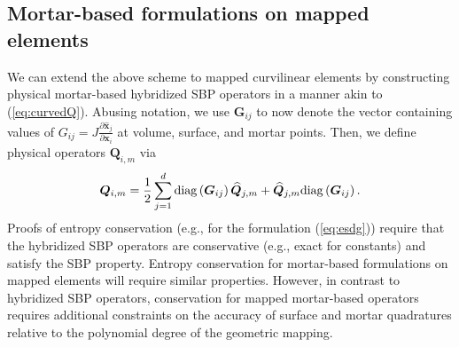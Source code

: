 \documentclass{svjour3}                     %
\renewcommand{\hat}{\widehat}
\renewcommand{\tilde}{\widetilde}
\newcommand{\diag}[1]{{\rm diag}\LRp{#1}}
\newcommand{\td}[2]{\frac{{\rm d}#1}{{\rm d}{\rm #2}}}
\newcommand{\pd}[2]{\frac{\partial#1}{\partial#2}}
\newcommand{\LRp}[1]{\left( #1 \right)}
\renewcommand{\note}[1]{{\color{blue}{#1}}}
\begin{document}
%


\subsection{Mortar-based formulations on mapped elements}

We can extend the above scheme to mapped curvilinear elements by constructing physical mortar-based hybridized SBP operators in a manner akin to (\ref{eq:curvedQ}).  Abusing notation, we use $\bm{G}_{ij}$ to now denote the vector containing values of $G_{ij} = J\pd{\hat{\bm{x}}_j}{\bm{x}_i}$ at volume, surface, and mortar points.  Then, we define physical operators $\bm{Q}_{i,m}$ via
\begin{equation}
\bm{Q}_{i,m} = \frac{1}{2}\sum_{j=1}^d \diag{\bm{G}_{ij}}\hat{\bm{Q}}_{j,m} + \hat{\bm{Q}}_{j,m} \diag{\bm{G}_{ij}}.
\label{eq:curvedQ_mortar}
\end{equation}
Proofs of entropy conservation (e.g., for the formulation (\ref{eq:esdg})) require that the hybridized SBP operators are conservative (e.g., exact for constants) and satisfy the SBP property.  Entropy conservation for mortar-based formulations on mapped elements will require similar properties.  However, in contrast to hybridized SBP operators, conservation for mapped mortar-based operators requires additional constraints on the accuracy of surface and mortar quadratures relative to the polynomial degree of the geometric mapping.  
\end{document}

